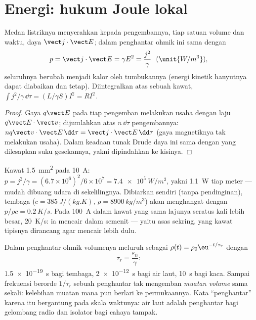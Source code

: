\section{Energi: hukum Joule lokal}

\begin{proposition}\label{prop:b2:charges-currents-conduction:joule}
Medan listriknya menyerahkan kepada pengembannya, tiap satuan volume dan waktu,
daya $\vect j\cdot\vect E$; dalam penghantar ohmik ini sama dengan
\[
p = \vect j\cdot\vect E = \gamma E^2 = \frac{j^2}\gamma \ \ (\unit{W/m^3}) ,
\]
seluruhnya berubah menjadi kalor oleh tumbukannya (energi kinetik hanyutnya
dapat diabaikan dan tetap). Diintegralkan atas sebuah kawat, $\int j^2/\gamma\,\dd\tau
= (L/\gamma S)I^2 = RI^2$.
\end{proposition}

\begin{proof}
Gaya $q\vect E$ pada tiap pengemban melakukan usaha dengan laju $q\vect E\cdot\vect v$;
dijumlahkan atas $n\,\dd\tau$ pengembannya: $nq\vect v\cdot\vect E\,\dd\tau = \vect j\cdot
\vect E\,\dd\tau$ (gaya magnetiknya tak melakukan usaha). Dalam keadaan tunak
Drude daya ini sama dengan yang dilesapkan suku gesekannya, yakni
dipindahkan ke kisinya.
\end{proof}

\begin{example}\label{ex:b2:charges-currents-conduction:heating}
Kawat \qty{1.5}{mm^2} pada \qty{10}{A}: $p = j^2/\gamma = (6.7 \times 10^6)^2/6 \times 10^7 =
\qty{7.4e5}{W/m^3}$, yakni \qty{1.1}{W} tiap meter --- mudah dibuang udara
di sekelilingnya. Dibiarkan sendiri (tanpa pendinginan), tembaga ($c = \qty{385}{J/(kg.K)}$,
$\rho = \qty{8900}{kg/m^3}$) akan menghangat dengan $p/\rho c = \qty{0.2}{K/s}$. Pada \qty{100}{A}
dalam kawat yang sama lajunya seratus kali lebih besar, \qty{20}{K/s}: ia
mencair dalam semenit --- yaitu asas sekring, yang kawat tipisnya
dirancang agar mencair lebih dulu.
\end{example}

\begin{proposition}\label{prop:b2:charges-currents-conduction:relaxation}
Dalam penghantar ohmik  volumenya meluruh sebagai $\rho(t) =
\rho_0\eu^{-t/\tau_r}$ dengan
\[
\tau_r = \frac{\varepsilon_0}{\gamma} :
\]
\qty{1.5e-19}{s} bagi tembaga, \qty{2e-12}{s} bagi air laut, \qty{10}{s} bagi kaca.
Sampai frekuensi berorde $1/\tau_r$ sebuah penghantar tak mengemban \emph{muatan
volume} sama sekali: kelebihan muatan mana pun berlari ke permukaannya. Kata
``penghantar'' karena itu bergantung pada skala waktunya: air laut adalah penghantar
bagi gelombang radio dan isolator bagi cahaya tampak.
\end{proposition}

